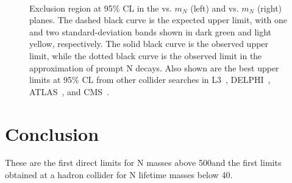 \begin{figure}[h]
\noindent
{}\\
\caption{Exclusion region at 95$\%$ CL in the \mixpare vs. $m_N$ (left) and \mixparm vs. $m_N$ (right) planes.
The dashed black curve is the expected upper limit, with one and two standard-deviation
bands shown in dark green and light yellow, respectively. The solid black curve is the observed
upper limit, while the dotted black curve is the observed limit in the approximation of
prompt N decays. Also shown are the best upper limits at 95$\%$ CL from other collider searches
in L3~\cite{ACHARD200167}, DELPHI~\cite{Abreu:1996pa}, ATLAS~\cite{Aad_2015}, and CMS~\cite{Sirunyan:2018xiv}.}
\label{fig:limits}
\end{figure}

\section{Conclusion}
These are the first direct limits for N
masses above 500\GeV and the first
limits obtained at a hadron collider for N
lifetime masses below 40\GeV.
